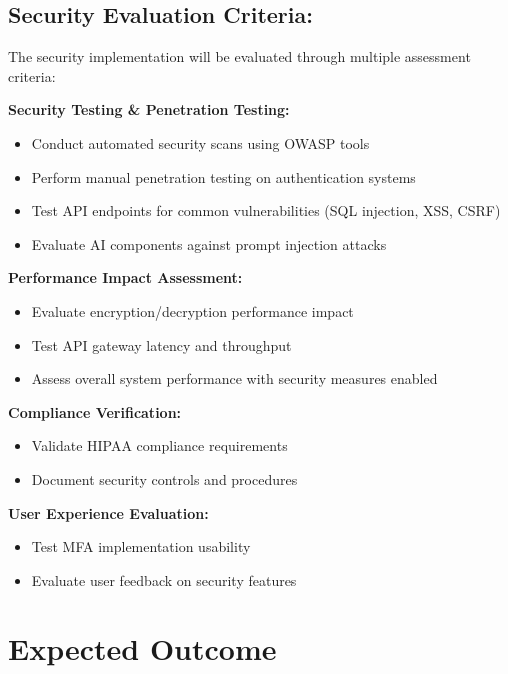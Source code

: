 \documentclass[a4paper, 12pt]{article}
\begin{document}
\subsection{Security Evaluation Criteria:}

The security implementation will be evaluated through multiple assessment criteria:

\textbf{Security Testing \& Penetration Testing:}

\begin{itemize}
    \item Conduct automated security scans using OWASP tools
    \item Perform manual penetration testing on authentication systems
    \item Test API endpoints for common vulnerabilities (SQL injection, XSS, CSRF)
    \item Evaluate AI components against prompt injection attacks
\end{itemize}

\textbf{Performance Impact Assessment:}
\begin{itemize}
    \item Evaluate encryption/decryption performance impact
    \item Test API gateway latency and throughput
    \item Assess overall system performance with security measures enabled
\end{itemize}

\textbf{Compliance Verification:}
\begin{itemize}
    \item Validate HIPAA compliance requirements
    \item Document security controls and procedures
\end{itemize}

\textbf{User Experience Evaluation:}
\begin{itemize}
    \item Test MFA implementation usability
    \item Evaluate user feedback on security features

\end{itemize}

\section{Expected Outcome}
\end{document}
